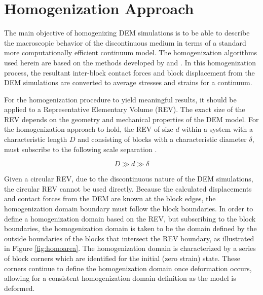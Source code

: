 \section{Homogenization Approach}

The main objective of homogenizing DEM simulations is to be able to describe the macroscopic behavior of the discontinuous medium in terms
of a standard more computationally efficient continuum model. The homogenization algorithms used herein are based on the methods developed
by \citet{daddetta_particle_2004} and \citet{wellmann_homogenization_2008}. In this homogenization process, the resultant inter-block contact forces and block displacement from the DEM simulations are converted to average stresses and strains for a continuum.

For the homogenization procedure to yield meaningful results, it should be applied to a Representative Elementary Volume (REV). The exact size of the REV depends on the geometry and mechanical properties of the DEM model. For the homogenization approach to hold, the REV of size $d$ within a system with a characteristic length $D$ and consisting of blocks with a characteristic diameter $\delta$, must subscribe to the following scale separation \citep{wellmann_homogenization_2008}. 

\begin{equation}
D\gg d\gg\delta\label{eqn:hom1a}
\end{equation}

Given a circular REV, due to the discontinuous nature of the DEM simulations, the circular REV cannot be used directly. Because the
calculated displacements and contact forces from the DEM are known at the block edges, the homogenization domain boundary must follow
the block boundaries. In order to define a homogenization domain based on the REV, but subscribing to the block boundaries, the homogenization
domain is taken to be the domain defined by the outside boundaries of the blocks that intersect the REV boundary, as illustrated in Figure \ref{fig:homoarea}. The homogenization domain is characterized by a series of block corners which are identified for the initial (zero strain) state. These corners continue to define the homogenization domain once deformation occurs, allowing for a consistent homogenization domain definition as the model is deformed. 

